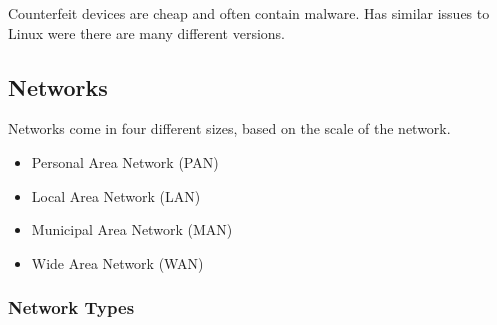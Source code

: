 Counterfeit devices are cheap and often contain malware.
Has similar issues to Linux were there are many different versions.

\subsection{Networks}
Networks come in four different sizes, based on the scale of the network.
\begin{itemize}
    \item Personal Area Network (PAN)
    \item Local Area Network (LAN)
    \item Municipal Area Network (MAN)
    \item Wide Area Network (WAN)
\end{itemize}
\subsubsection{Network Types}
